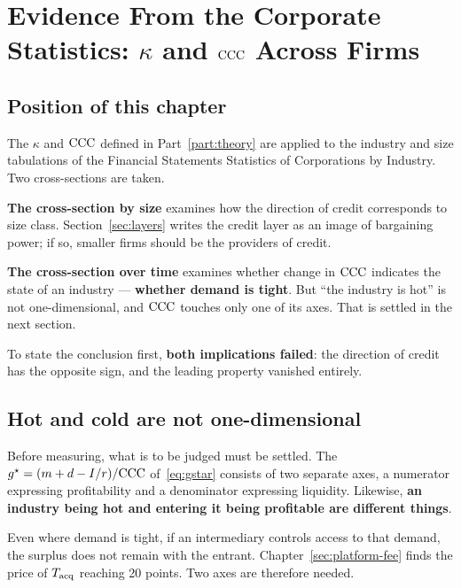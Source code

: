 \chapter{Evidence From the Corporate Statistics: \texorpdfstring{$\kappa$}{kappa} and \texorpdfstring{$\mathrm{CCC}$}{CCC} Across Firms}
\label{part:industry}

\section{Position of this chapter}

The $\kappa$ and $\mathrm{CCC}$ defined in Part~\ref{part:theory} are applied to the industry and size
tabulations of the Financial Statements Statistics of Corporations by Industry. Two
cross-sections are taken.

\textbf{The cross-section by size} examines how the direction of credit corresponds to size
class. Section~\ref{sec:layers} writes the credit layer as an image of bargaining power; if
so, smaller firms should be the providers of credit.

\textbf{The cross-section over time} examines whether change in $\mathrm{CCC}$ indicates the state of
an industry --- \textbf{whether demand is tight}. But ``the industry is hot'' is not
one-dimensional, and $\mathrm{CCC}$ touches only one of its axes. That is settled in the next section.

To state the conclusion first, \textbf{both implications failed}: the direction of credit has
the opposite sign, and the leading property vanished entirely.

\section{Hot and cold are not one-dimensional}

Before measuring, what is to be judged must be settled. The
$g^\star=(m+d-I/r)/\mathrm{CCC}$ of~\eqref{eq:gstar} consists of two separate axes, a numerator
expressing profitability and a denominator expressing liquidity. Likewise,
\textbf{an industry being hot and entering it being profitable are different things}.

Even where demand is tight, if an intermediary controls access to that demand, the surplus
does not remain with the entrant. Chapter~\ref{sec:platform-fee} finds the price of
$T_{\rm acq}$ reaching 20 points. Two axes are therefore needed.

